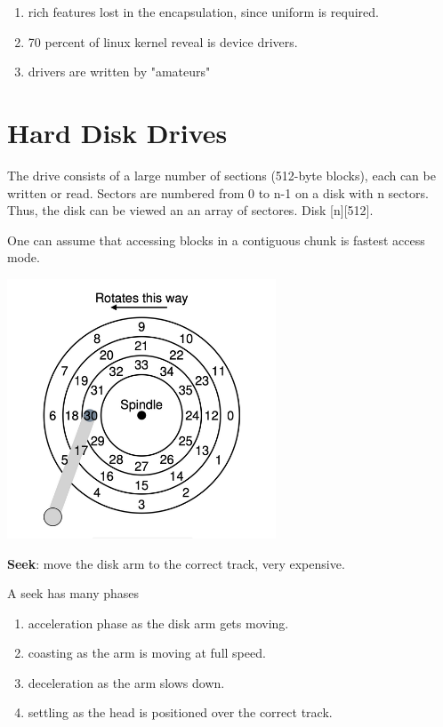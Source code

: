         \begin{enumerate}
            \item rich features lost in the encapsulation, since uniform is required.
            \item 70 percent of linux kernel reveal is device drivers.
            \item drivers are written by "amateurs"
        \end{enumerate}


\section{Hard Disk Drives}


        The drive consists of a large number of sections (512-byte blocks), each can be written 
        or read. Sectors are numbered from 0 to n-1 on a disk with n sectors. Thus, the disk 
        can be viewed an an array of sectores. Disk [n][512].

        One can assume that accessing blocks in a contiguous chunk is fastest access mode.


        \includegraphics[width=0.6\textwidth]{chapters/Persistence/persistence/tracks.png}

        \textbf{Seek}: move the disk arm to the correct track, very expensive.

        A seek has many phases

        \begin{enumerate}
            \item acceleration phase as the disk arm gets moving.
            \item coasting as the arm is moving at full speed.
            \item deceleration as the arm slows down.
            \item settling as the head is positioned over the correct track.
        \end{enumerate}

